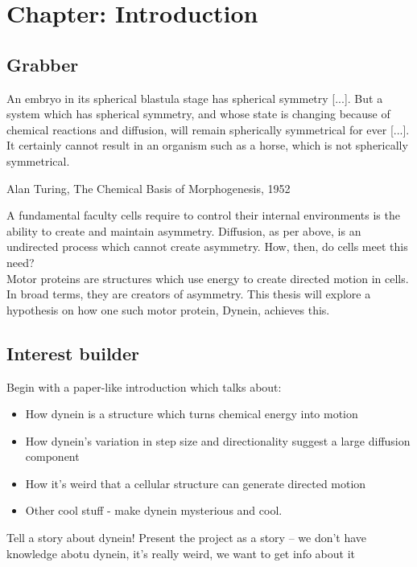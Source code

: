 \documentclass[10pt]{article} %
\begin{document}
\tableofcontents
\listoffigures
\newpage

\section{Chapter: Introduction}
\subsection{Grabber}

\epigraph{An embryo in its spherical blastula stage has spherical symmetry [...]. But a system which has spherical symmetry, and whose state is changing because of chemical reactions and diffusion, will remain spherically symmetrical for ever [...]. It certainly cannot result in an organism such as a horse, which is not spherically symmetrical.}{Alan Turing, The Chemical Basis of Morphogenesis, 1952}

A fundamental faculty cells require to control their internal environments is the ability to create and maintain asymmetry. Diffusion, as per above, is an undirected process which cannot create asymmetry. How, then, do cells meet this need?\\

Motor proteins are structures which use energy to create directed motion in cells. In broad terms, they are creators of asymmetry. This thesis will explore a hypothesis on how one such motor protein, Dynein, achieves this.\\


\subsection{Interest builder}
Begin with a paper-like introduction which talks about:

\begin{itemize}
\item How dynein is a structure which turns chemical energy into motion
\item How dynein's variation in step size and directionality suggest a large diffusion component \cite{reck2006single}
\item How it's weird that a cellular structure can generate directed motion
\item Other cool stuff - make dynein mysterious and cool.
\end{itemize}

Tell a story about dynein! Present the project as a story -- we don't have knowledge abotu dynein, it's really weird, we want to get info about it
\end{document}
